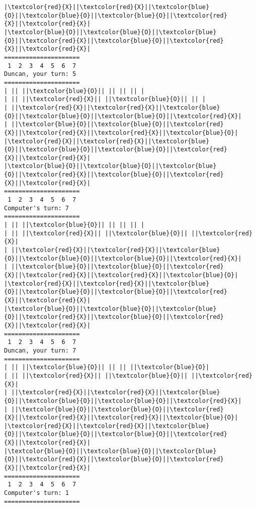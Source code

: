 \documentclass{article}
\begin{document}
\begin{Verbatim}[commandchars=\\\{\}]
|\textcolor{red}{X}||\textcolor{red}{X}||\textcolor{blue}{O}||\textcolor{blue}{O}||\textcolor{blue}{O}||\textcolor{red}{X}||\textcolor{red}{X}|
|\textcolor{blue}{O}||\textcolor{blue}{O}||\textcolor{blue}{O}||\textcolor{red}{X}||\textcolor{blue}{O}||\textcolor{red}{X}||\textcolor{red}{X}|
=====================
 1  2  3  4  5  6  7
Duncan, your turn: 5
=====================
| || ||\textcolor{blue}{O}|| || || || |
| || ||\textcolor{red}{X}|| ||\textcolor{blue}{O}|| || |
| ||\textcolor{red}{X}||\textcolor{red}{X}||\textcolor{blue}{O}||\textcolor{blue}{O}||\textcolor{blue}{O}||\textcolor{red}{X}|
| ||\textcolor{blue}{O}||\textcolor{blue}{O}||\textcolor{red}{X}||\textcolor{red}{X}||\textcolor{red}{X}||\textcolor{blue}{O}|
|\textcolor{red}{X}||\textcolor{red}{X}||\textcolor{blue}{O}||\textcolor{blue}{O}||\textcolor{blue}{O}||\textcolor{red}{X}||\textcolor{red}{X}|
|\textcolor{blue}{O}||\textcolor{blue}{O}||\textcolor{blue}{O}||\textcolor{red}{X}||\textcolor{blue}{O}||\textcolor{red}{X}||\textcolor{red}{X}|
=====================
 1  2  3  4  5  6  7
Computer's turn: 7
=====================
| || ||\textcolor{blue}{O}|| || || || |
| || ||\textcolor{red}{X}|| ||\textcolor{blue}{O}|| ||\textcolor{red}{X}|
| ||\textcolor{red}{X}||\textcolor{red}{X}||\textcolor{blue}{O}||\textcolor{blue}{O}||\textcolor{blue}{O}||\textcolor{red}{X}|
| ||\textcolor{blue}{O}||\textcolor{blue}{O}||\textcolor{red}{X}||\textcolor{red}{X}||\textcolor{red}{X}||\textcolor{blue}{O}|
|\textcolor{red}{X}||\textcolor{red}{X}||\textcolor{blue}{O}||\textcolor{blue}{O}||\textcolor{blue}{O}||\textcolor{red}{X}||\textcolor{red}{X}|
|\textcolor{blue}{O}||\textcolor{blue}{O}||\textcolor{blue}{O}||\textcolor{red}{X}||\textcolor{blue}{O}||\textcolor{red}{X}||\textcolor{red}{X}|
=====================
 1  2  3  4  5  6  7
Duncan, your turn: 7
=====================
| || ||\textcolor{blue}{O}|| || || ||\textcolor{blue}{O}|
| || ||\textcolor{red}{X}|| ||\textcolor{blue}{O}|| ||\textcolor{red}{X}|
| ||\textcolor{red}{X}||\textcolor{red}{X}||\textcolor{blue}{O}||\textcolor{blue}{O}||\textcolor{blue}{O}||\textcolor{red}{X}|
| ||\textcolor{blue}{O}||\textcolor{blue}{O}||\textcolor{red}{X}||\textcolor{red}{X}||\textcolor{red}{X}||\textcolor{blue}{O}|
|\textcolor{red}{X}||\textcolor{red}{X}||\textcolor{blue}{O}||\textcolor{blue}{O}||\textcolor{blue}{O}||\textcolor{red}{X}||\textcolor{red}{X}|
|\textcolor{blue}{O}||\textcolor{blue}{O}||\textcolor{blue}{O}||\textcolor{red}{X}||\textcolor{blue}{O}||\textcolor{red}{X}||\textcolor{red}{X}|
=====================
 1  2  3  4  5  6  7
Computer's turn: 1
=====================

\end{Verbatim}
\end{document}
